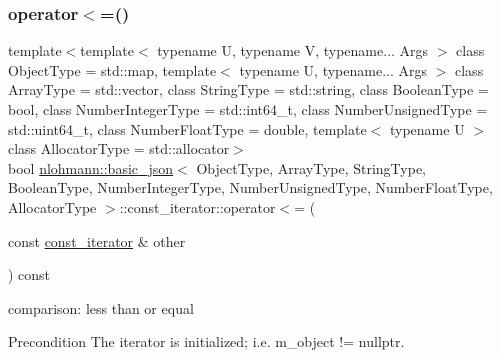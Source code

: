 \subsubsection{\texorpdfstring{operator$<$=()}{operator<=()}}
{\footnotesize\ttfamily template$<$template$<$ typename U, typename V, typename... Args $>$ class Object\+Type = std\+::map, template$<$ typename U, typename... Args $>$ class Array\+Type = std\+::vector, class String\+Type  = std\+::string, class Boolean\+Type  = bool, class Number\+Integer\+Type  = std\+::int64\+\_\+t, class Number\+Unsigned\+Type  = std\+::uint64\+\_\+t, class Number\+Float\+Type  = double, template$<$ typename U $>$ class Allocator\+Type = std\+::allocator$>$ \\
bool \hyperlink{classnlohmann_1_1basic__json}{nlohmann\+::basic\+\_\+json}$<$ Object\+Type, Array\+Type, String\+Type, Boolean\+Type, Number\+Integer\+Type, Number\+Unsigned\+Type, Number\+Float\+Type, Allocator\+Type $>$\+::const\+\_\+iterator\+::operator$<$= (\begin{DoxyParamCaption}\item[{const \hyperlink{classnlohmann_1_1basic__json_1_1const__iterator}{const\+\_\+iterator} \&}]{other }\end{DoxyParamCaption}) const\hspace{0.3cm}{\ttfamily [inline]}}



comparison\+: less than or equal 

\begin{DoxyPrecond}{Precondition}
The iterator is initialized; i.\+e. {\ttfamily m\+\_\+object != nullptr}. 
\end{DoxyPrecond}
\hypertarget{classnlohmann_1_1basic__json_1_1const__iterator_a2b6561a7b39b9aa3a220aa3b6e2d9589}{}\label{classnlohmann_1_1basic__json_1_1const__iterator_a2b6561a7b39b9aa3a220aa3b6e2d9589} 

